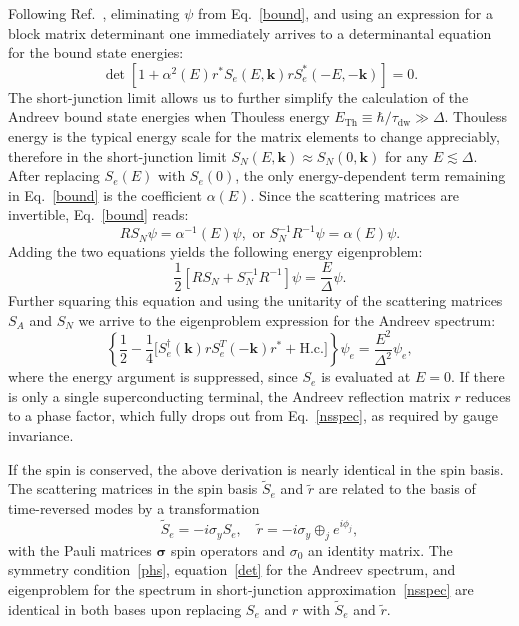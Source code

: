 \documentclass[twocolumn, notitlepage, 10pt, aps, floatfix, showpacs, prb, citeautoscript]{revtex4-1}
\begin{document}
Following Ref.~, eliminating $\psi$ from Eq.~\eqref{bound}, and using an expression for a block matrix determinant one immediately arrives to a determinantal equation for the bound state energies:
\begin{equation}\label{det}
\det[
1+\alpha^2(E)r^*S_e(E,\mathbf k)rS^*_e(-E,-\mathbf k)
]=0.
\end{equation}
The short-junction limit allows us to further simplify the calculation of the Andreev bound state energies when Thouless energy $E_\textrm{Th} \equiv \hbar/\tau_\textrm{dw} \gg \Delta$.
Thouless energy is the typical energy scale for the matrix elements to change appreciably, therefore in the short-junction limit $S_N(E, \mathbf k) \approx S_N(0, \mathbf k)$ for any $E\lesssim \Delta$.
After replacing $S_e(E)$ with $S_e(0)$, the only energy-dependent term remaining in Eq.~\eqref{bound} is the coefficient $\alpha(E)$.
Since the scattering matrices are invertible, Eq.~\eqref{bound} reads:
\begin{equation}
RS_N\psi
=\alpha^{-1}(E)\psi,\textrm{ or }
S_N^{-1}R^{-1}\psi
=\alpha(E)\psi.
\end{equation}
Adding the two equations yields the following energy eigenproblem:
\begin{equation}
\frac{1}{2}[RS_N+S_N^{-1}R^{-1}]\psi
=\frac{E}{\Delta}\psi.
\end{equation}
Further squaring this equation and using the unitarity of the scattering matrices $S_A$ and $S_N$ we arrive to the eigenproblem expression for the Andreev spectrum:
\begin{equation}\label{nsspec}
\left\{
\frac{1}{2}-\frac{1}{4}
\big[
S_e^\dag(\mathbf k)rS_e^T(-\mathbf k)r^*+\mathrm{H.c.}
\big]
\right\}\psi_e=\frac{E^2}{\Delta^2}\psi_e,
\end{equation}
where the energy argument is suppressed, since $S_e$ is evaluated at $E=0$.
If there is only a single superconducting terminal, the Andreev reflection matrix $r$ reduces to a phase factor, which fully drops out from Eq.~\eqref{nsspec}, as required by gauge invariance.

If the spin is conserved, the above derivation is nearly identical in the spin basis.
The scattering matrices in the spin basis $\tilde S_e$ and $\tilde r$ are related to the basis of time-reversed modes by a transformation
\begin{equation}
\tilde S_{e}=-i\sigma_yS_{e},\quad\tilde r=-i\sigma_y\oplus_j e^{i\phi_j},
\end{equation}
with the Pauli matrices $\bm\sigma$ spin operators and $\sigma_0$ an identity matrix.
The symmetry condition~\eqref{phs}, equation~\eqref{det} for the Andreev spectrum, and eigenproblem for the spectrum in short-junction approximation~\eqref{nsspec} are identical in both bases upon replacing $S_e$ and $r$ with $\tilde S_e$ and $\tilde r$.
\end{document}
